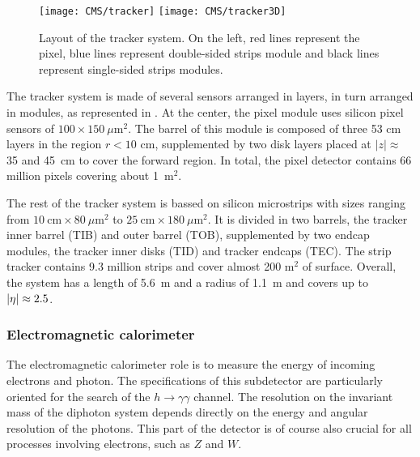         \begin{figure}[h!]
            \centering
            \texttt{[image: CMS/tracker]}
            \texttt{[image: CMS/tracker3D]}
            \caption{Layout of the tracker system.
            On the left, red lines represent the pixel, blue lines represent double-sided
            strips module and black lines represent single-sided strips modules.}
            \label{fig:CMS/tracker}
        \end{figure}



        The tracker system is made of several sensors arranged in layers, in turn arranged
        in modules, as represented in . At the center, the pixel module
        uses silicon pixel sensors of $100 \times 150~\mu$m$^2$. The barrel of this module
        is composed of three 53 cm layers in the region $r < 10$ cm, supplemented by two
        disk layers placed at $\left|z\right| \approx$ 35 and 45~cm to cover the forward
        region. In total, the pixel detector contains 66 million pixels covering about 1~m$^2$.

        The rest of the tracker system is bassed on silicon microstrips with sizes ranging
        from $10~\text{cm} \times 80~\mu\text{m}^2$ to $25~\text{cm} \times 180~\mu\text{m}^2$.
        It is divided in two barrels, the tracker inner barrel (TIB) and outer barrel (TOB),
        supplemented by two endcap modules, the tracker inner disks (TID) and tracker endcaps
        (TEC). The strip tracker contains 9.3 million strips and cover almost 200 m$^2$ of
        surface. Overall, the system has a length of 5.6~m and a radius of 1.1~m and covers
        up to $\left| \eta \right| \approx 2.5$.

            \subsubsection{Electromagnetic calorimeter}

        The electromagnetic calorimeter role is to measure the energy of incoming electrons
        and photon. The specifications of this subdetector are particularly oriented for
        the search of the $h \rightarrow \gamma \gamma$ channel. The resolution on the
        invariant mass of the diphoton system depends directly on the energy and angular
        resolution of the photons. This part of the detector is of course also crucial for
        all processes involving electrons, such as $Z$ and $W$.

